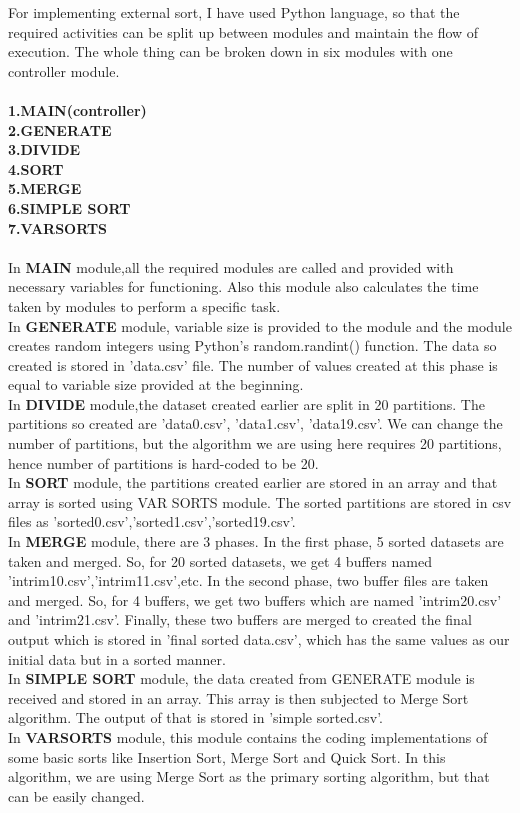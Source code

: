 \documentclass[12pt]{article}
\begin{document}
For implementing external sort, I have used Python language, so that the required activities can be split up between modules and maintain the flow of execution.
The whole thing can be broken down in six modules with one controller module.\\
\\
\textbf{1.MAIN(controller)}\\
\textbf{2.GENERATE}\\
\textbf{3.DIVIDE}\\
\textbf{4.SORT}\\
\textbf{5.MERGE}\\
\textbf{6.SIMPLE SORT}\\
\textbf{7.VARSORTS}\\
\\
In \textbf{MAIN} module,all the required modules are called and provided with necessary variables for functioning. Also this module also calculates the time taken by modules to perform a specific task.\\
In \textbf{GENERATE} module, variable size is provided to the module and the module creates random integers using Python's random.randint() function. The data so created is stored in 'data.csv' file. The number of values created at this phase is equal to variable size provided at the beginning.\\
In \textbf{DIVIDE} module,the dataset created earlier are split in 20 partitions. The partitions so created are 'data0.csv', 'data1.csv', 'data19.csv'. We can change the number of partitions, but the algorithm we are using here requires 20 partitions, hence number of partitions is hard-coded to be 20. \\
In \textbf{SORT} module, the partitions created earlier are stored in an array and that array is sorted using VAR SORTS module. The sorted partitions are stored in csv files as 'sorted0.csv','sorted1.csv','sorted19.csv'.\\
In \textbf{MERGE} module, there are 3 phases. In the first phase, 5 sorted datasets are taken and merged. So, for 20 sorted datasets, we get 4 buffers named 'intrim10.csv','intrim11.csv',etc. In the second phase, two buffer files are taken and merged. So, for 4 buffers, we get two buffers which are named 'intrim20.csv' and 'intrim21.csv'. Finally, these two buffers are merged to created the final output which is stored in 'final sorted data.csv', which has the same values as our initial data but in a sorted manner.\\ 
In \textbf{SIMPLE SORT} module, the data created from GENERATE module is received and stored in an array. This array is then subjected to Merge Sort algorithm. The output of that is stored in 'simple sorted.csv'.\\
In \textbf{VARSORTS} module, this module contains the coding implementations of some basic sorts like Insertion Sort, Merge Sort and Quick Sort. In this algorithm, we are using Merge Sort as the primary sorting algorithm, but that can be easily changed. \\
\end{document}
